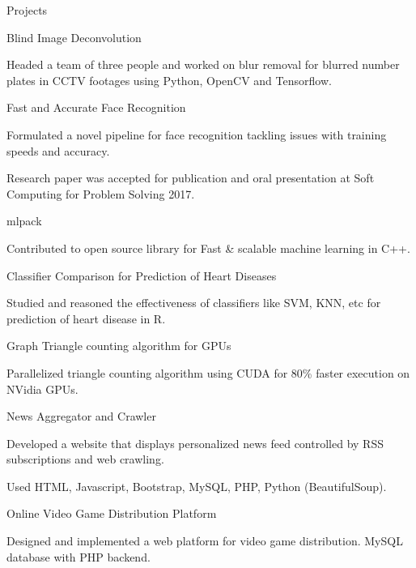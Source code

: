 \documentclass{resume} %
\begin{document}
\begin{rSection}{Projects}


\begin{rSubsection}{Blind Image Deconvolution}{}{}{}
\item Headed a team of three people and worked on blur removal for blurred number plates in CCTV footages using Python, OpenCV and Tensorflow.
\end{rSubsection}
\begin{rSubsection}{Fast and Accurate Face Recognition}{}{}{}
\item Formulated a novel pipeline for face recognition tackling issues with training speeds and accuracy. 
\item Research paper was accepted for publication and oral presentation at Soft Computing for Problem Solving 2017.
\end{rSubsection}
\begin{rSubsection}{mlpack}{}{}{}
\item Contributed to open source library for Fast \& scalable machine learning in C++.  
\end{rSubsection}

\begin{rSubsection}{Classifier Comparison for Prediction of Heart Diseases}{}{}{}
\item Studied and reasoned the effectiveness of classifiers like SVM, KNN, etc for prediction of heart disease in R.
\end{rSubsection}

\begin{rSubsection}{Graph Triangle counting algorithm for GPUs}{}{}{}
\item Parallelized triangle counting algorithm using CUDA for 80\% faster execution on NVidia GPUs.
\end{rSubsection}

\begin{rSubsection}{News Aggregator and Crawler}{}{}{}
\item Developed a website that displays personalized news feed controlled by RSS subscriptions and web crawling.
\item Used HTML, Javascript, Bootstrap, MySQL, PHP, Python (BeautifulSoup).
\end{rSubsection}
\begin{rSubsection}{Online Video Game Distribution Platform}{}{}{}
\item Designed and implemented a web platform for video game distribution. MySQL database with PHP backend.  
\end{rSubsection}


\end{rSection}
\end{document}
